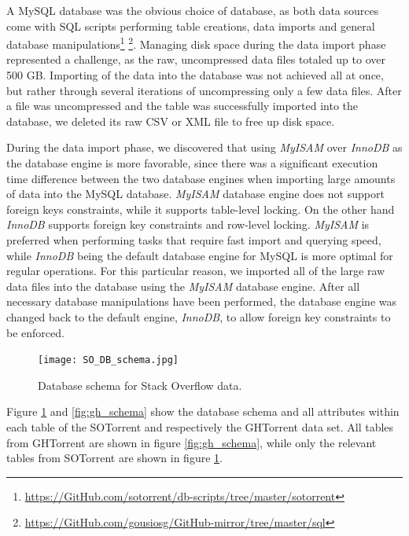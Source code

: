         A MySQL database was the obvious choice of database, as both data sources come with SQL scripts performing table creations, data imports and general database manipulations\footnote{\label{SO_sql} \url{https://GitHub.com/sotorrent/db-scripts/tree/master/sotorrent}} \footnote{\label{GH_sql} \url{https://GitHub.com/gousiosg/GitHub-mirror/tree/master/sql}}. Managing disk space during the data import phase represented a challenge, as the raw, uncompressed data files totaled up to over 500 GB. Importing of the data into the database was not achieved all at once, but rather through several iterations of uncompressing only a few data files. After a file was uncompressed and the table was successfully imported into the database, we deleted its raw CSV or XML file to free up disk space. 
        
        During the data import phase, we discovered that using \textit{MyISAM} over \textit{InnoDB} as the database engine is more favorable, since there was a significant execution time difference between the two database engines when importing large amounts of data into the MySQL database. \textit{MyISAM} database engine does not support foreign keys constraints, while it supports table-level locking. On the other hand \textit{InnoDB} supports foreign key constraints and row-level locking. \textit{MyISAM} is preferred when performing tasks that require fast import and querying speed, while \textit{InnoDB} being the default database engine for MySQL is more optimal for regular operations. For this particular reason, we imported all of the large raw data files into the database using the \textit{MyISAM} database engine. After all necessary database manipulations have been performed, the database engine was changed back to the default engine, \textit{InnoDB}, to allow foreign key constraints to be enforced. 
      
        \begin{figure}[!ht]
          \centering
          \texttt{[image: SO\_DB\_schema.jpg]}\\
          \caption{Database schema for Stack Overflow data.}
          \label{fig:so_schema}
        \end{figure}
        
         Figure \ref{fig:so_schema} and \ref{fig:gh_schema} show the database schema and all attributes within each table of the SOTorrent and respectively the GHTorrent data set. All tables from GHTorrent are shown in figure \ref{fig:gh_schema}, while only the relevant tables from SOTorrent are shown in figure \ref{fig:so_schema}. 
 
